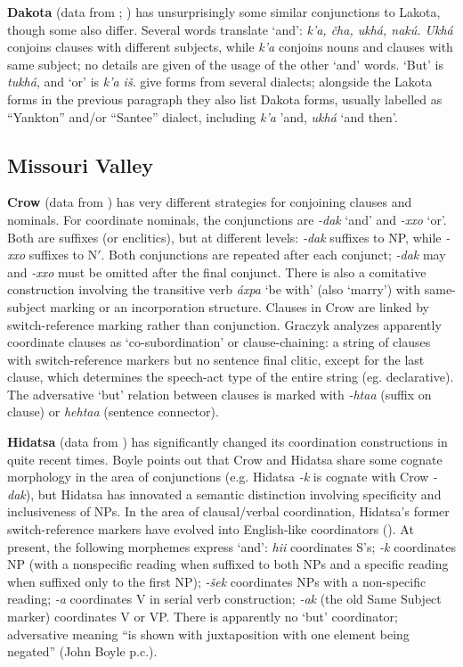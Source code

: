 \documentclass[output=paper]{LSP/langsci}
\begin{document}
\textbf{Dakota} (data from \citealt{Riggs1851};  \citealt{BoasDeloria1941}) has unsurprisingly some similar conjunctions to Lakota, though some also differ. Several words translate `and': \textit{k'a, \v{c}ha, ukhá, nakú. Ukhá} conjoins clauses with different subjects, while \textit{k'a} conjoins nouns and clauses with same subject; no details are given of the usage of the other `and' words. `But' is \textit{tukhá}, and `or' is \textit{k'a i\v{s}}. \citeauthor{BoasDeloria1941} give forms from several dialects; alongside the Lakota forms in the previous paragraph they also list Dakota forms, usually labelled as ``Yankton'' and/or ``Santee'' dialect, including \textit{k'a} 'and, \textit{ukhá} `and then'.     

\subsection{Missouri Valley}
 
\textbf{Crow} (data from \citealt{Graczyk2007}) has very different strategies for conjoining clauses and
nominals. For coordinate nominals, the conjunctions are \textit{-dak} `and' and \textit{-xxo} `or'. Both are suffixes (or enclitics), but at different levels: \textit{-dak} suffixes to NP, while \textit{-xxo} suffixes to N$'$. Both conjunctions are repeated after each conjunct; \textit{-dak} may and \textit{-xxo} must be omitted after the final conjunct. There is also a comitative construction involving the transitive verb \textit{áxpa} `be with' (also `marry') with same-subject marking or an incorporation structure. Clauses in Crow are linked by switch-reference marking rather than conjunction. Graczyk analyzes apparently coordinate clauses as `co-subordination' or clause-chaining: a string of clauses with switch-reference markers but no sentence final clitic, except for the last clause, which determines the speech-act type of the entire string (eg. declarative). The adversative `but' relation between clauses is marked with \textit{-htaa} (suffix on clause) or \textit{hehtaa} (sentence connector).

\textbf{Hidatsa} (data from \citealt{Boyle2005,Boyle2007,Boyle2011}) has significantly changed its coordination constructions in quite recent times. Boyle points out that Crow and Hidatsa share some cognate morphology in the area of conjunctions (e.g. Hidatsa \textit{-k} is cognate with Crow \textit{-dak}), but Hidatsa has innovated a semantic distinction involving specificity and inclusiveness of NPs. In the area of clausal/verbal coordination, Hidatsa's former switch-reference markers have evolved into English-like coordinators (\citealt{Boyle2011}). At present, the following morphemes express `and': \textit{hii} coordinates S's; \textit{-k} coordinates NP (with a nonspecific reading when suffixed to both NPs and a specific reading when suffixed only to the first NP); \textit{-\v{s}ek} coordinates NPs with a non-specific reading; \textit{-a} coordinates V in serial verb construction; \textit{-ak} (the old Same Subject marker) coordinates V or VP. There is apparently no `but' coordinator; adversative meaning ``is shown with juxtaposition with one element being negated'' (John Boyle p.c.).
\end{document}
